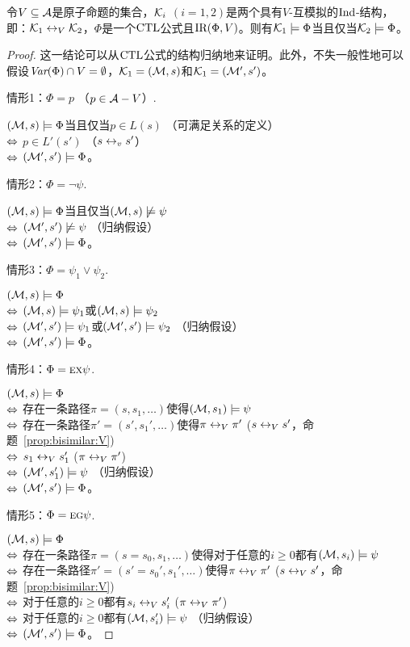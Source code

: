 \begin{theorem}\label{thm:V-bisimulation:EQ}
	令$V\subseteq {\cal A}$是原子命题的集合，${\cal K}_i$ $(i=1,2)$是两个具有$V$-互模拟的$\textrm{Ind}$-结构，即：${\cal K}_1 \leftrightarrow_V {\cal K}_2$，$\Phi$是一个$\textrm{CTL}$公式且$\textrm{IR}(\Phi, V)$。则有${\cal K}_1\models \Phi$当且仅当${\cal K}_2\models \Phi$。
\end{theorem}
\begin{proof}
	这一结论可以从$\textrm{CTL}$公式的结构归纳地来证明。此外，不失一般性地可以假设$\textit{Var}(\Phi) \cap V=\emptyset$，${\cal K}_1=({\cal M},s)$和${\cal K}_1=({\cal M}',s')$。
	
	情形1：$\Phi = p$ （$p\in {\cal A} -V$）.
	
	$({\cal M},s)\models \Phi$当且仅当$p\in L(s)$ \hfill （可满足关系的定义）\\
	$\Leftrightarrow$ $p\in L'(s')$ \hfill （$s \leftrightarrow_v s'$）\\
	$\Leftrightarrow$ $({\cal M}',s') \models \Phi$。
	
	情形2：$\Phi = \neg \psi$.
	
	$({\cal M},s)\models \Phi$当且仅当$({\cal M},s) \not \models \psi$\\
	$\Leftrightarrow$ $({\cal M}',s')\not \models \psi$  \hfill （归纳假设）\\
	$\Leftrightarrow$ $({\cal M}',s') \models \Phi$。
	
	情形3：$\Phi = \psi_1 \vee \psi_2$.
	
	$({\cal M},s)\models \Phi$\\
	$\Leftrightarrow$ $({\cal M},s) \models \psi_1$或$({\cal M},s) \models \psi_2$\\
	$\Leftrightarrow$ $({\cal M}',s')  \models \psi_1$或$({\cal M}',s') \models \psi_2$ \hfill （归纳假设）\\
	$\Leftrightarrow$ $({\cal M}',s') \models \Phi$。
	
	情形4：$\Phi=\textsc{e}\textsc{x}\psi$.
	
	$({\cal M},s)\models \Phi$\\
	$\Leftrightarrow$ 存在一条路径$\pi=(s,s_1,\dots)$使得$({\cal M},s_1)\models \psi$\\
	$\Leftrightarrow$ 存在一条路径$\pi'=(s',s_1',\dots)$使得$\pi \leftrightarrow_V \pi'$ \hfill ($s \leftrightarrow_V s'$，命题~\ref{prop:bisimilar:V})\\
	$\Leftrightarrow$ $s_1 \leftrightarrow_V s_1'$ \hfill ($\pi \leftrightarrow_V \pi'$)\\
	$\Leftrightarrow$ $({\cal M}',s_1') \models \psi$   \hfill   （归纳假设）\\
	$\Leftrightarrow$ $({\cal M}',s')\models \Phi$。
	
	情形5：$\Phi = \textsc{e} \textsc{g} \psi$.
	
	$({\cal M},s)\models \Phi$\\
	$\Leftrightarrow$ 存在一条路径$\pi=(s=s_0,s_1,\dots)$使得对于任意的$i\ge 0$都有$({\cal M},s_i)\models \psi$\\
	$\Leftrightarrow$ 存在一条路径$\pi'=(s'=s_0',s_1',\dots)$使得$\pi \leftrightarrow_V \pi'$ \hfill ($s \leftrightarrow_V s'$，命题~\ref{prop:bisimilar:V})\\
	$\Leftrightarrow$ 对于任意的$i\ge 0$都有$s_i \leftrightarrow_V s_i'$ \hfill ($\pi \leftrightarrow_V \pi'$)\\
	$\Leftrightarrow$ 对于任意的$i\ge 0$都有$({\cal M},s_i') \models \psi$ \hfill （归纳假设）\\
	$\Leftrightarrow$ $({\cal M}',s')\models \Phi$。
	

\end{proof}
